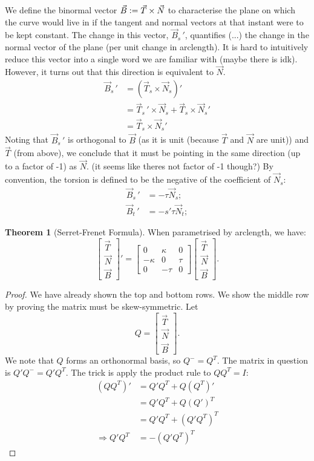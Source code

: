 \documentclass{article}
\newcommand{\vc}{\vcentcolon}
\theoremstyle{definition}
\newtheorem{thm}{Theorem}[subsubsection]
\begin{document}
We define the binormal vector $\vec B\vc=\vec T\times\vec N$ to characterise the plane on which the curve would live in if the tangent and normal vectors at that instant were to be kept constant. The change in this vector, $\vec B_s\,'$, quantifies (...) the change in the normal vector of the plane (per unit change in arclength). It is hard to intuitively reduce this vector into a single word we are familiar with (maybe there is idk). However, it turns out that this direction is equivalent to $\vec N$.
\begin{align*}
	\vec B_s\,'&=(\vec T_s\times\vec N_s)'\\
	&=\vec T_s\,'\times\vec N_s+\vec T_s\times\vec N_s'\\
	&=\vec T_s\times\vec N_s'
\end{align*}
Noting that $\vec B_s\,'$ is orthogonal to $\vec B$ (as it is unit (because $\vec T$ and $\vec N$ are unit)) and $\vec T$ (from above), we conclude that it must be pointing in the same direction (up to a factor of -1) as $\vec N$. (it seems like theres not factor of -1 though?) By convention, the torsion is defined to be the negative of the coefficient of $\vec N_s$:
\begin{align*}
	\vec B_s\,'&=-\tau\vec N_s;\\
	\vec B_t\,'&=-s'\tau\vec N_t;
\end{align*}
\begin{thm}[Serret-Frenet Formula]
	When parametrised by arclength, we have:
	\[\begin{bmatrix}\vec T\\\vec N\\\vec B\end{bmatrix}'=\begin{bmatrix}0&\kappa&0\\-\kappa&0&\tau\\0&-\tau&0\end{bmatrix}\begin{bmatrix}\vec T\\\vec N\\\vec B\end{bmatrix}.\]
\end{thm}
\begin{proof}
	We have already shown the top and bottom rows. We show the middle row by proving the matrix must be skew-symmetric. Let \[Q=\begin{bmatrix}\vec T\\\vec N\\\vec B\end{bmatrix}.\] We note that $Q$ forms an orthonormal basis, so $Q^-=Q^T$. The matrix in question is $Q'Q^-=Q'Q^T$. The trick is apply the product rule to $QQ^T=I$:
	\begin{align*}
		(QQ^T)'&=Q'Q^T+Q(Q^T)'\\
		&=Q'Q^T+Q(Q')^T\\
		&=Q'Q^T+(Q'Q^T)^T\\
		\Rightarrow Q'Q^T&=-(Q'Q^T)^T
	\end{align*}
\end{proof}
\end{document}
